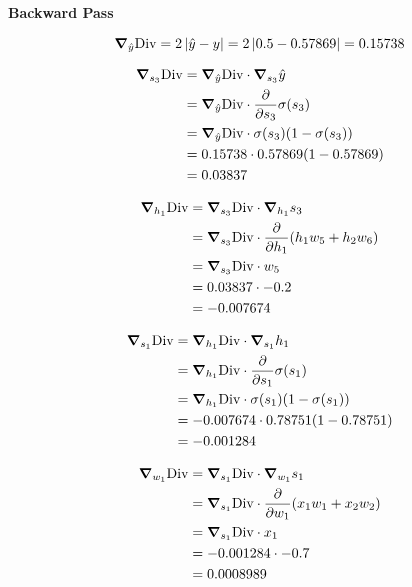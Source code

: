 \documentclass[12pt]{article}
\begin{document}
\noindent
\textbf{Backward Pass}

\begin{equation}
    \grad_{\hat{y}} \text{Div} = 2 \, |\hat{y} - y| = 2 \, |0.5-0.57869| = 0.15738
\end{equation}

\begin{equation}
    \begin{split}
        \grad_{s_3} \text{Div}
        &= \grad_{\hat{y}}\text{Div} \cdot \grad_{s_3} \hat{y} \\
        &= \grad_{\hat{y}}\text{Div} \cdot \frac{\partial}{\partial s_3} \sigma(s_3) \\
        &= \grad_{\hat{y}}\text{Div} \cdot \sigma(s_3)(1-\sigma(s_3)) \\
        &= 0.15738 \cdot 0.57869 (1-0.57869) \\
        &= 0.03837
    \end{split}
\end{equation}

\begin{equation}
    \begin{split}
        \grad_{h_1}\text{Div}
        &= \grad_{s_3}\text{Div} \cdot \grad_{h_1} s_3 \\
        &= \grad_{s_3}\text{Div} \cdot \frac{\partial}{\partial h_1} (h_1 w_5 + h_2 w_6) \\
        &= \grad_{s_3}\text{Div} \cdot w_5 \\
        &= 0.03837 \cdot -0.2 \\
        &= -0.007674
    \end{split}
\end{equation}

\begin{equation}
    \begin{split}
        \grad_{s_1}\text{Div}
        &= \grad_{h_1}\text{Div} \cdot \grad_{s_1}h_1 \\
        &= \grad_{h_1}\text{Div} \cdot \frac{\partial}{\partial s_1} \sigma(s_1) \\
        &= \grad_{h_1}\text{Div} \cdot \sigma(s_1)(1-\sigma(s_1)) \\
        &= -0.007674 \cdot 0.78751(1-0.78751) \\
        &= -0.001284
    \end{split}
\end{equation}

\begin{equation}
    \begin{split}
        \grad_{w_1}\text{Div}
        &= \grad_{s_1}\text{Div} \cdot \grad_{w_1} s_1 \\
        &= \grad_{s_1}\text{Div} \cdot \frac{\partial}{\partial w_1} (x_1 w_1 + x_2 w_2) \\
        &= \grad_{s_1}\text{Div} \cdot x_1 \\
        &= -0.001284 \cdot -0.7 \\
        &= 0.0008989 \\
    \end{split}
\end{equation}
\end{document}
